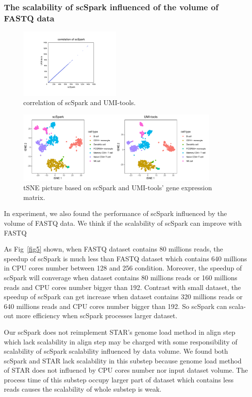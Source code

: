 \documentclass[conference]{IEEEtran}
\begin{document}
\subsubsection{The scalability of scSpark influenced of the volume of FASTQ data}
\begin{figure}
	\centering
	\includegraphics[width=0.45\textwidth]{fig6.pdf}
	\caption{correlation of scSpark and UMI-tools.} \label{fig6}
\end{figure}
\begin{figure}
	\centering
	\includegraphics[width=0.9\textwidth]{fig7.pdf}
	\caption{tSNE picture based on scSpark and UMI-tools' gene expression matrix.} \label{fig7}
\end{figure}
In experiment, we also found the performance of scSpark influenced by the volume of FASTQ data.
We think if the scalability of scSpark can improve with FASTQ

As Fig~\ref{fig5} shown, when FASTQ dataset contains 80 millions reads, the speedup of scSpark is much less than FASTQ dataset which contains 640 millions in CPU cores number between 128 and 256 condition.
Moreover, the speedup of scSpark will converage when dataset contains 80 millions reads or 160 millions reads and CPU cores number bigger than 192.
Contrast with small dataset, the speedup of scSpark can get increase when dataset contains 320 millions reads or 640 millions reads and CPU cores number bigger than 192.
So scSpark can scala-out more efficiency when scSpark processes larger dataset.

Our scSpark does not reimplement STAR's genome load method in align step which lack scalability in align step may be charged with some responsibility of scalability of scSpark scalability influenced by data volume.
We found both scSpark and STAR lack scalability in this substep because genome load method of STAR does not influencd by CPU cores number nor input dataset volume.
The process time of this substep occupy larger part of dataset which contains less reads causes the scalability of whole substep is weak. 
\end{document}
